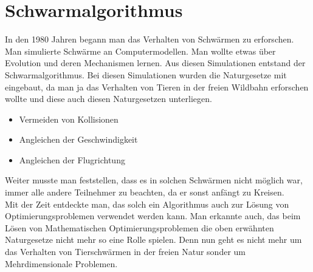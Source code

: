 \section{Schwarmalgorithmus}

In den 1980 Jahren begann man das Verhalten von Schwärmen zu erforschen. Man simulierte Schwärme an Computermodellen. Man wollte etwas über Evolution und deren Mechanismen lernen. Aus diesen Simulationen entstand der Schwarmalgorithmus.
Bei diesen Simulationen wurden die Naturgesetze mit eingebaut, da man ja das Verhalten von Tieren in der freien Wildbahn erforschen wollte und diese auch diesen Naturgesetzen unterliegen.
\begin{itemize}
\item Vermeiden von Kollisionen 
\item Angleichen der Geschwindigkeit
\item Angleichen der Flugrichtung
\end{itemize}

Weiter musste man feststellen, dass es in solchen Schwärmen nicht möglich war, immer alle andere Teilnehmer zu beachten, da er sonst anfängt zu Kreisen.\\
Mit der Zeit entdeckte man, das solch ein Algorithmus auch zur Lösung von Optimierungsproblemen verwendet werden kann.
Man erkannte auch, das beim Lösen von Mathematischen Optimierungsproblemen die oben erwähnten Naturgesetze nicht mehr so eine Rolle spielen. Denn nun geht es nicht mehr um das Verhalten von Tierschwärmen in der freien Natur sonder um Mehrdimensionale Problemen.